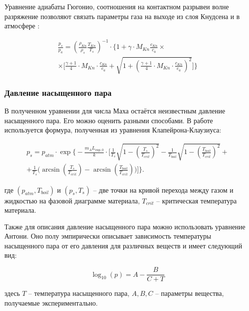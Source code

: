 Уравнение адиабаты Гюгонио, соотношения на контактном разрывеи волне разряжение позволяют связать параметры газа на выходе из слоя Кнудсена и в атмосфере \cite{klassen2018simulation}:

\begin{multline}
\label{eq:rh}
    \frac{p_s}{p_a} = \left( \frac{\rho_{Kn}}{\rho_s} \frac{T_{Kn}}{T_s} \right)^{-1} \cdot \Bigg\{1 + \gamma \cdot M_{Kn} \frac{c_{Kn}}{c_a} \times \\ \times \Bigg[ \frac{\gamma + 1}{4} \cdot M_{Kn} \cdot \frac{c_{Kn}}{c_a} + \sqrt{1 + \left( \frac{\gamma + 1}{4} \cdot M_{Kn} \cdot \frac{c_{Kn}}{c_a} \right)^2} \Bigg] \Bigg\}
\end{multline}

\subsubsection{Давление насыщенного пара}

В полученном уравнении для числа Маха остаётся неизвестным давление насыщенного пара. Его можно оценить разными способами. В работе \cite{klassen2018simulation} используется формура, полученная из уравнения Клапейрона-Клаузиуса:

\begin{multline}
\label{eq:cc}
    p_s = p_{atm}\cdot\exp \Bigg\{ -\frac{m_A L_{vap,0}}{k} \cdot \Bigg[ \frac{1}{T_s} \sqrt{1 - \left( \frac{T_s}{T_{crit}} \right)^2} - \frac{1}{T_{boil}} \sqrt{1 - \left( \frac{T_{boil}}{T_{crit}} \right)^2} + \\ + \frac{1}{T_s} \bigg( \arcsin \left( \frac{T_s}{T_{crit}} \right) - \arcsin\left(\frac{T_{boil}}{T_{crit}} \right)\bigg) \Bigg] \Bigg\}.
\end{multline}

\noindent
где $(p_{atm}, T_{boil})$ и $(p_{s}, T_{s})$ -- две точки на кривой перехода между газом и жидкостью на фазовой диаграмме материала, $T_{crit}$ -- критическая температура материала.

Также для описания давление насыщенного пара можно использовать уравнение Антони. Оно полу эмпирически описывает зависимость температуры насыщенного пара от его давления для различных веществ и имеет следующий вид:

\begin{equation}
    \log_{10}(p) = A - \frac{B}{C + T}
\end{equation}

\noindent
здесь $T$ -- температура насыщенного пара, $A, B, C$ -- параметры вещества, получаемые экспериментально.

